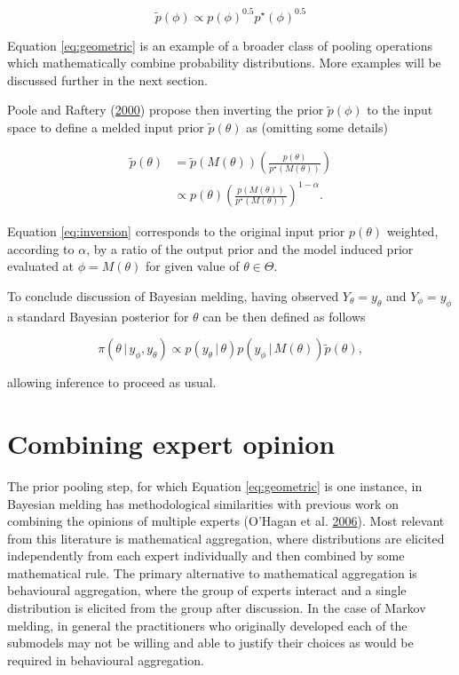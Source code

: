 \documentclass[11pt,]{book}
\begin{document}
\begin{equation}
\tilde p(\phi) \propto p(\phi)^{0.5}p^\star(\phi)^{0.5} \label{eq:geometric}
\end{equation}

Equation \eqref{eq:geometric} is an example of a broader class of
pooling operations which mathematically combine probability
distributions. More examples will be discussed further in the next
section.

Poole and Raftery (\protect\hyperlink{ref-poole2000inference}{2000})
propose then inverting the prior \(\tilde p(\phi)\) to the input space
to define a melded input prior \(\tilde p(\theta)\) as (omitting some
details)

\begin{align}
\tilde p(\theta) &= \tilde p(M(\theta)) \left(\frac{p(\theta)}{p^\star(M(\theta))}\right) \nonumber \\
&\propto p(\theta) \left(\frac{p(M(\theta))}{p^\star(M(\theta))}\right)^{1-\alpha}. \label{eq:inversion}
\end{align}

Equation \eqref{eq:inversion} corresponds to the original input prior
\(p(\theta)\) weighted, according to \(\alpha\), by a ratio of the
output prior and the model induced prior evaluated at
\(\phi = M(\theta)\) for given value of \(\theta \in \Theta\).

To conclude discussion of Bayesian melding, having observed
\(Y_\theta = y_\theta\) and \(Y_\phi = y_\phi\) a standard Bayesian
posterior for \(\theta\) can be then defined as follows

\begin{equation}
\pi(\theta \, | \, y_\phi, y_\theta) \propto p(y_\theta \, | \, \theta)p(y_\phi \, | \, M(\theta)) \tilde p(\theta),
\end{equation}

allowing inference to proceed as usual.

\section{\texorpdfstring{Combining expert opinion
\label{sec:experts}}{Combining expert opinion }}\label{combining-expert-opinion}

The prior pooling step, for which Equation \eqref{eq:geometric} is one
instance, in Bayesian melding has methodological similarities with
previous work on combining the opinions of multiple experts (O'Hagan et
al. \protect\hyperlink{ref-o2006uncertain}{2006}). Most relevant from
this literature is mathematical aggregation, where distributions are
elicited independently from each expert individually and then combined
by some mathematical rule. The primary alternative to mathematical
aggregation is behavioural aggregation, where the group of experts
interact and a single distribution is elicited from the group after
discussion. In the case of Markov melding, in general the practitioners
who originally developed each of the submodels may not be willing and
able to justify their choices as would be required in behavioural
aggregation.
\end{document}
